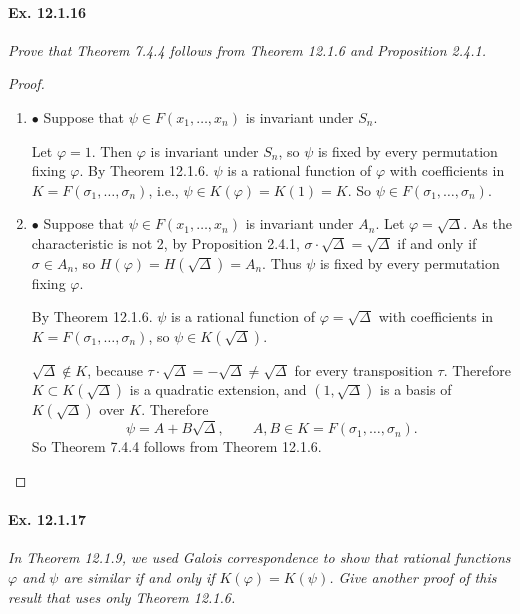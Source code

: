 \documentclass[11pt,a4paper]{article}
\newcommand{\be} {\begin{enumerate}}
\newcommand{\ee} {\end{enumerate}}
\begin{document}
\paragraph{Ex. 12.1.16}

{\it Prove that Theorem 7.4.4 follows from Theorem 12.1.6 and Proposition 2.4.1.
}

\begin{proof}
\be
\item[$\bullet$] Suppose that $\psi  \in F(x_1,\ldots,x_n)$ is invariant under $S_n$.

Let $\varphi = 1$. Then $\varphi$ is invariant under $S_n$, so $\psi$ is fixed by every permutation fixing $\varphi$. By Theorem 12.1.6. $\psi$ is a rational function of $\varphi$ with coefficients in $K = F(\sigma_1,\ldots,\sigma_n)$, i.e., $\psi \in K(\varphi) = K(1) = K$. So $\psi \in F(\sigma_1,\ldots,\sigma_n)$.

\item[$\bullet$] Suppose that $\psi  \in F(x_1,\ldots,x_n)$ is invariant under $A_n$.
Let $\varphi = \sqrt{\Delta}$. As the characteristic is not 2, by Proposition 2.4.1, $\sigma \cdot \sqrt{\Delta} = \sqrt{\Delta}$ if and only if $\sigma \in A_n$, so $H(\varphi) = H(\sqrt{\Delta})= A_n$.
Thus  $\psi$ is fixed by every permutation fixing $\varphi$.

By Theorem 12.1.6. $\psi$ is a rational function of $\varphi =\sqrt{\Delta}$ with coefficients in $K = F(\sigma_1,\ldots,\sigma_n)$, so $\psi \in K(\sqrt{\Delta})$.

$\sqrt{\Delta} \not \in K$, because $\tau \cdot \sqrt{\Delta} = - \sqrt{\Delta}\ne  \sqrt{\Delta}$ for every transposition $\tau$. Therefore $K \subset K(\sqrt{\Delta})$ is a quadratic extension, and $(1,\sqrt{\Delta} )$ is a basis of $K(\sqrt{\Delta})$ over $K$. Therefore
$$\psi = A+B \sqrt{\Delta},\qquad A,B \in K = F(\sigma_1,\ldots,\sigma_n).$$
So Theorem 7.4.4 follows from Theorem 12.1.6.
\ee
\end{proof}

\paragraph{Ex. 12.1.17}

{\it In Theorem 12.1.9, we used Galois correspondence to show that rational functions $\varphi$ and $\psi$ are similar if and only if $K(\varphi) = K(\psi)$. Give another proof of this result that uses only Theorem 12.1.6.
}
\end{document}
